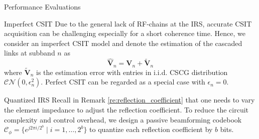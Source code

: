 \documentclass[journal]{IEEEtran}
\begin{document}
\begin{section}{Performance Evaluations}

		\begin{subsection}{Imperfect CSIT}
			Due to the general lack of RF-chains at the IRS, accurate CSIT acquisition can be challenging especially for a short coherence time. Hence, we consider an imperfect CSIT model and denote the estimation of the cascaded links at subband $n$ as
			\begin{equation}
				\hat{\boldsymbol{V}}_{n} = \boldsymbol{V}_{n} + \tilde{\boldsymbol{V}}_{n}
			\end{equation}
			where $\tilde{\boldsymbol{V}}_{n}$ is the estimation error with entries in i.i.d. CSCG distribution $\mathcal{CN}(0, \epsilon_{n}^2)$. Perfect CSIT can be regarded as a special case with $\epsilon_{n} = 0$. %
		\end{subsection}

		\begin{subsection}{Quantized IRS}
			Recall in Remark \ref{re:reflection_coefficient} that one needs to vary the element impedance to adjust the reflection coefficient. To reduce the circuit complexity and control overhead, we design a passive beamforming codebook $\mathcal{C}_\phi = \{e^{j 2 \pi i / 2^b} \mid i = 1, \dots, 2^b\}$ to quantize each reflection coefficient by $b$ bits.


\end{subsection}
\end{section}
\end{document}

